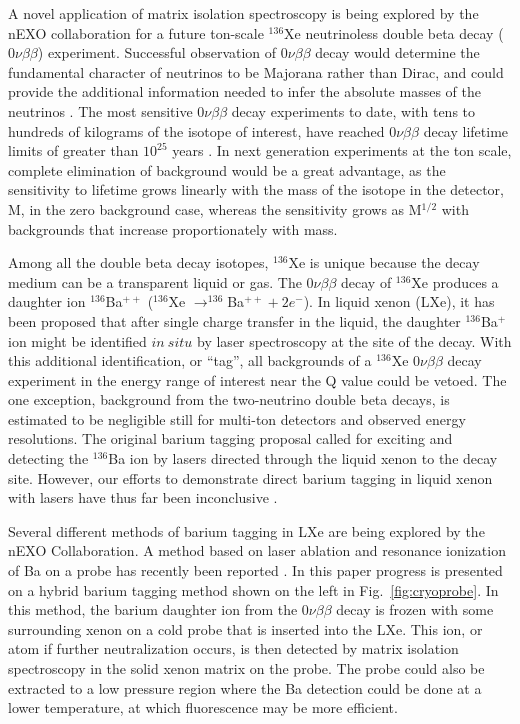 \documentclass[aps,pra,reprint,superscriptaddress]{revtex4-1}
\begin{document}
A novel application of matrix isolation spectroscopy is being explored by the nEXO collaboration for a future ton-scale $ ^{136} $Xe neutrinoless double beta decay ($ 0\nu\beta\beta $) experiment.
Successful observation of $ 0\nu\beta\beta $ decay would determine the fundamental character of neutrinos to be Majorana rather than Dirac, and could provide the additional information needed to infer the absolute masses of the neutrinos \cite{Avignone2008}.
The most sensitive $ 0\nu\beta\beta $ decay experiments to date, with tens to hundreds of kilograms of the isotope of interest, have reached $ 0\nu\beta\beta $ decay lifetime limits of greater than $ 10^{25} $ years \cite{Auger2012,Gando2013,Agostini2013,Albert2014}.
In next generation experiments at the ton scale, complete elimination of background would be a great advantage, as the sensitivity to lifetime grows linearly with the mass of the isotope in the detector, M, in the zero background case, whereas the sensitivity grows as M$^{1/2} $ with backgrounds that increase proportionately with mass.  

Among all the double beta decay isotopes, $ ^{136} $Xe is unique because the decay medium can be a transparent liquid or gas.
The $ 0\nu\beta\beta $ decay of $ ^{136}$Xe produces a daughter ion $ ^{136} $Ba$^{++}$ ($^{136}$Xe $\rightarrow^{136}$Ba$^{++} + 2e^{-}$). 
In liquid xenon (LXe), it has been proposed that after single charge transfer in the liquid, the daughter $ ^{136}$Ba$^+$ ion might be identified $in~situ$ by laser spectroscopy at the site of the decay.
With this additional identification, or ``tag'', all backgrounds of a $^{136}$Xe  $0\nu\beta\beta $ decay experiment in the energy range of interest near the Q value could be vetoed.
The one exception, background from the two-neutrino double beta decays, is estimated to be negligible still for multi-ton detectors and observed energy resolutions.
The original barium tagging proposal  \cite{Moe1991} called for exciting and detecting the $^{136}$Ba ion by lasers directed through the liquid xenon to the decay site.
However, our efforts to demonstrate direct barium tagging in liquid xenon with lasers have thus far been inconclusive \cite{Hall2012}.

Several different methods of barium tagging in LXe are being explored by the nEXO Collaboration.
A method based on laser ablation and resonance ionization of Ba on a probe has recently been reported \cite{Twelker2014}.
In this paper progress is presented on a hybrid barium tagging method shown on the left in Fig.~\ref{fig:cryoprobe}.
In this method, the barium daughter ion from the $ 0\nu\beta\beta $ decay is frozen with some surrounding xenon on a cold probe that is inserted into the LXe.
This ion, or atom if further neutralization occurs, is then detected by matrix isolation spectroscopy in the solid xenon matrix on the probe.
The probe could also be extracted to a low pressure region where the Ba detection could be done at a lower temperature, at which fluorescence may be more efficient.
\end{document}
